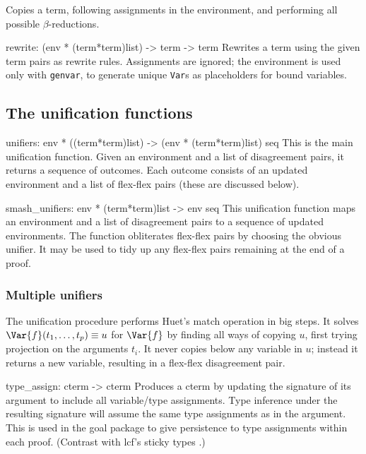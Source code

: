 Copies a term, 
following assignments in the environment,
and performing all possible \(\beta\)-reductions.

\beginprog
rewrite: (env * (term*term)list) -> term -> term
\endprog
Rewrites a term using the given term pairs as rewrite rules.  Assignments
are ignored; the environment is used only with {\tt genvar}, to generate
unique {\tt Var}s as placeholders for bound variables.


\subsection{The unification functions}


\beginprog
unifiers: env * ((term*term)list) -> (env * (term*term)list) seq
\endprog
This is the main unification function.
Given an environment and a list of disagreement pairs,
it returns a sequence of outcomes.
Each outcome consists of an updated environment and 
a list of flex-flex pairs (these are discussed below).

\beginprog
smash_unifiers: env * (term*term)list -> env seq
\endprog
This unification function maps an environment and a list of disagreement
pairs to a sequence of updated environments. The function obliterates
flex-flex pairs by choosing the obvious unifier. It may be used to tidy up
any flex-flex pairs remaining at the end of a proof.


\subsubsection{Multiple unifiers}
The unification procedure performs Huet's {\sc match} operation
\cite{huet75} in big steps.
It solves \(\Var{f}(t_1,\ldots,t_p) \equiv u\) for \(\Var{f}\) by finding
all ways of copying \(u\), first trying projection on the arguments
\(t_i\).  It never copies below any variable in \(u\); instead it returns a
new variable, resulting in a flex-flex disagreement pair.  


\beginprog
type_assign: cterm -> cterm
\endprog
Produces a cterm by updating the signature of its argument
to include all variable/type assignments.
Type inference under the resulting signature will assume the
same type assignments as in the argument.
This is used in the goal package to give persistence to type assignments
within each proof. 
(Contrast with {\sc lcf}'s sticky types \cite[page 148]{paulson-book}.)


